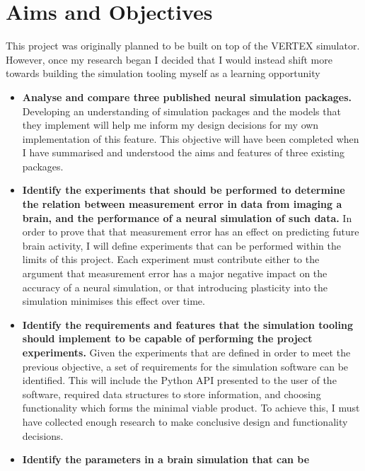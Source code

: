 \section{Aims and Objectives}

This project was originally planned to be built on top of the VERTEX simulator.
However, once my research began I decided that I would instead shift more
towards building the simulation tooling myself as a learning opportunity

\begin{itemize}
    \item \textbf{Analyse and compare three published neural simulation packages.}
          Developing an understanding of simulation packages and the models that
          they implement will help me inform my design decisions for my own
          implementation of this feature. This objective will have been
          completed when I have summarised and understood the aims and features
          of three existing packages.
    \item \textbf{Identify the experiments that should be performed to determine
              the relation between measurement error in data from imaging a
              brain, and the performance of a neural simulation of such data.}
              In order to prove that that measurement error has an effect on
              predicting future brain activity, I will define experiments that
              can be performed within the limits of this project. Each
              experiment must contribute either to the argument that measurement
              error has a major negative impact on the accuracy of a neural
              simulation, or that introducing plasticity into the simulation
              minimises this effect over time.
    \item \textbf{Identify the requirements and features that the simulation
              tooling should implement to be capable of performing the project
              experiments.} Given the experiments that are defined in order to
              meet the previous objective, a set of requirements for the
              simulation software can be identified. This will include the
              Python API presented to the user of the software, required data
              structures to store information, and choosing functionality which
              forms the minimal viable product. To achieve this, I must have
              collected enough research to make conclusive design and
              functionality decisions.
    \item \textbf{Identify the parameters in a brain simulation that can be
}
\end{itemize}
